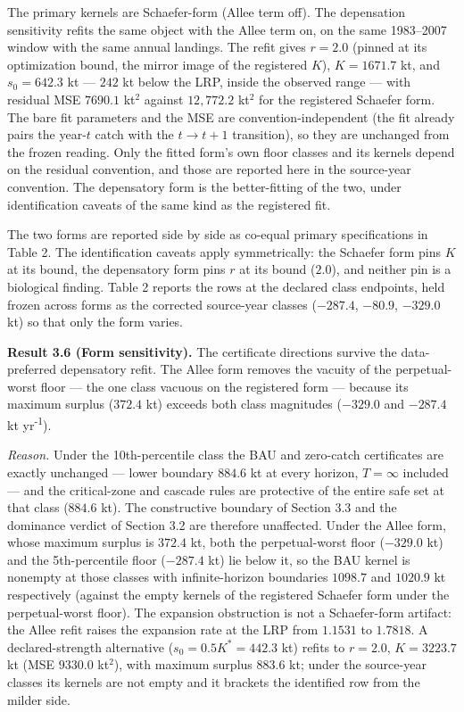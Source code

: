\documentclass[11pt]{article}
\begin{document}
The primary kernels are Schaefer-form (Allee term off). The depensation
sensitivity refits the same object with the Allee term on, on the same
1983--2007 window with the same annual landings. The refit gives
\(r = 2.0\) (pinned at its optimization bound, the mirror image of the
registered \(K\)), \(K = 1671.7\) kt, and \(s_0 = 642.3\) kt --- \(242\)
kt below the LRP, inside the observed range --- with residual MSE
\(7690.1\) kt\(^2\) against \(12{,}772.2\) kt\(^2\) for the registered
Schaefer form. The bare fit parameters and the MSE are
convention-independent (the fit already pairs the year-\(t\) catch with
the \(t \to t+1\) transition), so they are unchanged from the frozen
reading. Only the fitted form's own floor classes and its kernels depend
on the residual convention, and those are reported here in the
source-year convention. The depensatory form is the better-fitting of
the two, under identification caveats of the same kind as the registered
fit.

The two forms are reported side by side as co-equal primary
specifications in Table 2. The identification caveats apply
symmetrically: the Schaefer form pins \(K\) at its bound, the
depensatory form pins \(r\) at its bound (\(2.0\)), and neither pin is a
biological finding. Table 2 reports the rows at the declared class
endpoints, held frozen across forms as the corrected source-year classes
(\(-287.4\), \(-80.9\), \(-329.0\) kt) so that only the form varies.

\textbf{Result 3.6 (Form sensitivity).} The certificate directions
survive the data-preferred depensatory refit. The Allee form removes the
vacuity of the perpetual-worst floor --- the one class vacuous on the
registered form --- because its maximum surplus (\(372.4\) kt) exceeds
both class magnitudes (\(-329.0\) and \(-287.4\) kt yr\textsuperscript{-1}).

\emph{Reason.} Under the 10th-percentile class the BAU and zero-catch
certificates are exactly unchanged --- lower boundary \(884.6\) kt at
every horizon, \(T=\infty\) included --- and the critical-zone and
cascade rules are protective of the entire safe set at that class
(\(884.6\) kt). The constructive boundary of Section 3.3 and the
dominance verdict of Section 3.2 are therefore unaffected. Under the
Allee form, whose maximum surplus is \(372.4\) kt, both the
perpetual-worst floor (\(-329.0\) kt) and the 5th-percentile floor
(\(-287.4\) kt) lie below it, so the BAU kernel is nonempty at those
classes with infinite-horizon boundaries \(1098.7\) and \(1020.9\) kt
respectively (against the empty kernels of the registered Schaefer form
under the perpetual-worst floor). The expansion obstruction is not a
Schaefer-form artifact: the Allee refit raises the expansion rate at the
LRP from \(1.1531\) to \(1.7818\). A declared-strength alternative
(\(s_0 = 0.5K^* = 442.3\) kt) refits to \(r = 2.0\), \(K = 3223.7\) kt
(MSE \(9330.0\) kt\(^2\)), with maximum surplus \(883.6\) kt; under the
source-year classes its kernels are not empty and it brackets the
identified row from the milder side.
\end{document}
